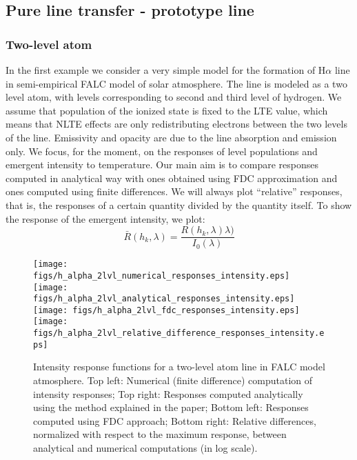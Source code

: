 \documentclass[referee]{aa}
\begin{document}
\subsection{Pure line transfer - prototype line}

\subsubsection{Two-level atom}

In the first example we consider a very simple model for the formation of H$\alpha$ line in semi-empirical FALC model of solar atmosphere\citep{FALC}. The line is modeled as a two level atom, with levels corresponding to second and third level of hydrogen. We assume that population of the ionized state is fixed to the LTE value, which means that NLTE effects are only redistributing electrons between the two levels of the line. Emissivity and opacity are due to the line absorption and emission only. We focus, for the moment, on the responses of level populations and emergent intensity to temperature. Our main aim is to compare responses computed in analytical way with ones obtained using FDC approximation and ones computed using finite differences. We will always plot ``relative'' responses, that is, the responses of a certain quantity divided by the quantity itself. To show the response of the emergent intensity, we plot:
\begin{equation}
 \bar{R}(h_k,\lambda) = \frac{R(h_k,\lambda)\lambda)}{I_0(\lambda)}
\end{equation}

\begin{figure*}
 \texttt{[image: figs/h\_alpha\_2lvl\_numerical\_responses\_intensity.eps]}
 \texttt{[image: figs/h\_alpha\_2lvl\_analytical\_responses\_intensity.eps]}
 \texttt{[image: figs/h\_alpha\_2lvl\_fdc\_responses\_intensity.eps]}
 \texttt{[image: figs/h\_alpha\_2lvl\_relative\_difference\_responses\_intensity.eps]}
 \caption{Intensity response functions for a two-level atom line in FALC model atmosphere. Top left: Numerical (finite difference) computation of intensity responses; Top right: Responses computed analytically using the method explained in the paper; Bottom left: Responses computed using FDC approach; Bottom right: Relative differences, normalized with respect to the maximum response,  between analytical and numerical computations (in log scale).}
 \label{example_1}
 \end{figure*}
 
\end{document}
